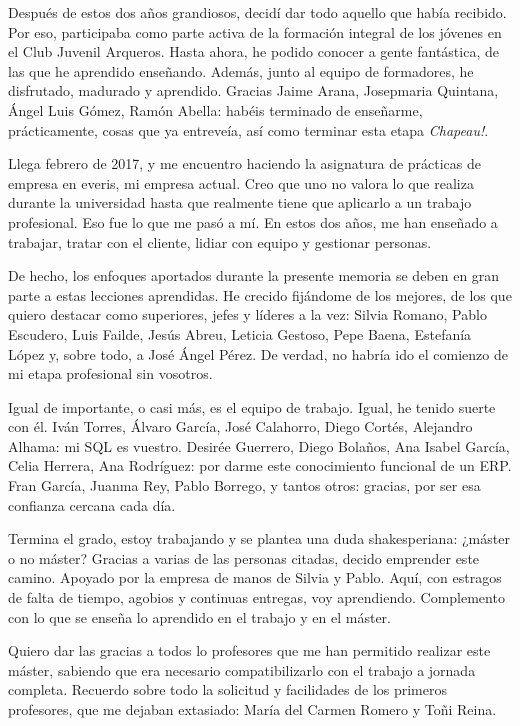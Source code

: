 Después de estos dos años grandiosos, decidí dar todo aquello que había recibido. Por eso, participaba como parte activa de la formación integral de los jóvenes en el Club Juvenil Arqueros. Hasta ahora, he podido conocer a gente fantástica, de las que he aprendido enseñando. Además, junto al equipo de formadores, he disfrutado, madurado y aprendido. Gracias Jaime Arana, Josepmaria Quintana, Ángel Luis Gómez, Ramón Abella: habéis terminado de enseñarme, prácticamente, cosas que ya entreveía, así como terminar esta etapa \textit{Chapeau!}.

Llega febrero de 2017, y me encuentro haciendo la asignatura de prácticas de empresa en everis, mi empresa actual. Creo que uno no valora lo que realiza durante la universidad hasta que realmente tiene que aplicarlo a un trabajo profesional. Eso fue lo que me pasó a mí. En estos dos años, me han enseñado a trabajar, tratar con el cliente, lidiar con equipo y gestionar personas.

De hecho, los enfoques aportados durante la presente memoria se deben en gran parte a estas lecciones aprendidas. He crecido fijándome de los mejores, de los que quiero destacar como superiores, jefes y líderes a la vez: Silvia Romano, Pablo Escudero, Luis Failde, Jesús Abreu, Leticia Gestoso, Pepe Baena, Estefanía López y, sobre todo, a José Ángel Pérez. De verdad, no habría ido el comienzo de mi etapa profesional sin vosotros.

Igual de importante, o casi más, es el equipo de trabajo. Igual, he tenido suerte con él. Iván Torres, Álvaro García, José Calahorro, Diego Cortés, Alejandro Alhama: mi SQL es vuestro. Desirée Guerrero, Diego Bolaños, Ana Isabel García, Celia Herrera, Ana Rodríguez: por darme este conocimiento funcional de un ERP. Fran García, Juanma Rey, Pablo Borrego, y tantos otros: gracias, por ser esa confianza cercana cada día.

Termina el grado, estoy trabajando y se plantea una duda shakesperiana: ¿máster o no máster? Gracias a varias de las personas citadas, decido emprender este camino. Apoyado por la empresa de manos de Silvia y Pablo. Aquí, con estragos de falta de tiempo, agobios y continuas entregas, voy aprendiendo. Complemento con lo que se enseña lo aprendido en el trabajo y en el máster.

Quiero dar las gracias a todos lo profesores que me han permitido realizar este máster, sabiendo que era necesario compatibilizarlo con el trabajo a jornada completa. Recuerdo sobre todo la solicitud y facilidades de los primeros profesores, que me dejaban extasiado: María del Carmen Romero y Toñi Reina.

